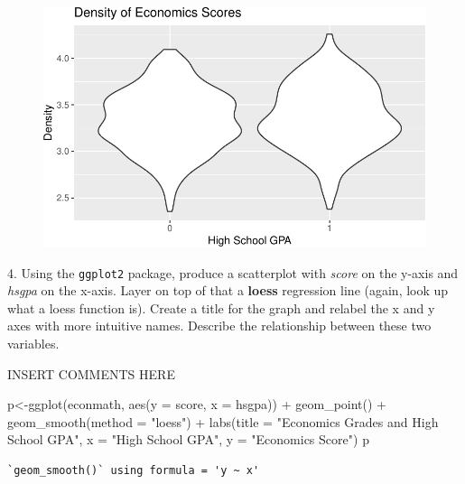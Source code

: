 \documentclass[
  letterpaper,
  DIV=11,
  numbers=noendperiod]{scrartcl}
\newenvironment{Shaded}{\begin{snugshade}}{\end{snugshade}}
\newcommand{\AttributeTok}[1]{\textcolor[rgb]{0.40,0.45,0.13}{#1}}
\newcommand{\FunctionTok}[1]{\textcolor[rgb]{0.28,0.35,0.67}{#1}}
\newcommand{\NormalTok}[1]{\textcolor[rgb]{0.00,0.23,0.31}{#1}}
\newcommand{\OtherTok}[1]{\textcolor[rgb]{0.00,0.23,0.31}{#1}}
\newcommand{\SpecialCharTok}[1]{\textcolor[rgb]{0.37,0.37,0.37}{#1}}
\newcommand{\StringTok}[1]{\textcolor[rgb]{0.13,0.47,0.30}{#1}}
\begin{document}
\begin{figure}[H]

{\centering \includegraphics{a1template_files/figure-pdf/unnamed-chunk-4-1.pdf}

}

\end{figure}

4. Using the \texttt{ggplot2} package, produce a scatterplot with
\emph{score} on the y-axis and \emph{hsgpa} on the x-axis. Layer on top
of that a \textbf{loess} regression line (again, look up what a loess
function is). Create a title for the graph and relabel the x and y axes
with more intuitive names. Describe the relationship between these two
variables.

INSERT COMMENTS HERE

\begin{Shaded}
\begin{Highlighting}[]
\NormalTok{p}\OtherTok{\textless{}{-}}\FunctionTok{ggplot}\NormalTok{(econmath, }\FunctionTok{aes}\NormalTok{(}\AttributeTok{y =}\NormalTok{ score, }\AttributeTok{x =}\NormalTok{ hsgpa)) }\SpecialCharTok{+}
  \FunctionTok{geom\_point}\NormalTok{() }\SpecialCharTok{+}
  \FunctionTok{geom\_smooth}\NormalTok{(}\AttributeTok{method =} \StringTok{"loess"}\NormalTok{) }\SpecialCharTok{+}
  \FunctionTok{labs}\NormalTok{(}\AttributeTok{title =} \StringTok{"Economics Grades and High School GPA"}\NormalTok{, }
       \AttributeTok{x =} \StringTok{"High School GPA"}\NormalTok{, }\AttributeTok{y =} \StringTok{"Economics Score"}\NormalTok{)}
\NormalTok{p}
\end{Highlighting}
\end{Shaded}

\begin{verbatim}
`geom_smooth()` using formula = 'y ~ x'
\end{verbatim}
\end{document}
